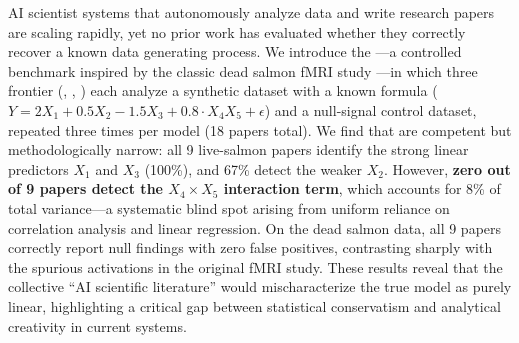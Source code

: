 AI scientist systems that autonomously analyze data and write research papers are scaling rapidly, yet no prior work has evaluated whether they correctly recover a known data generating process.
We introduce the \livesalmon---a controlled benchmark inspired by the classic dead salmon fMRI study \citep{bennett2009neural}---in which three frontier \llms (\gptmodel, \claudemodel, \geminimodel) each analyze a synthetic dataset with a known formula ($Y = 2X_1 + 0.5X_2 - 1.5X_3 + 0.8 \cdot X_4 X_5 + \epsilon$) and a null-signal control dataset, repeated three times per model (18 papers total).
We find that \aiscientists are competent but methodologically narrow: all 9 live-salmon papers identify the strong linear predictors $X_1$ and $X_3$ (100\%), and 67\% detect the weaker $X_2$.
However, \textbf{zero out of 9 papers detect the $X_4 \times X_5$ interaction term}, which accounts for 8\% of total variance---a systematic blind spot arising from uniform reliance on correlation analysis and linear regression.
On the dead salmon data, all 9 papers correctly report null findings with zero false positives, contrasting sharply with the spurious activations in the original fMRI study.
These results reveal that the collective ``AI scientific literature'' would mischaracterize the true model as purely linear, highlighting a critical gap between statistical conservatism and analytical creativity in current \aiscientist systems.
